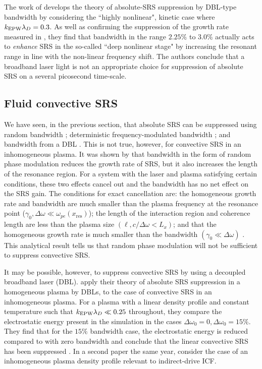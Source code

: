 The work of \citet{Zhou2018} develops the theory of absolute-SRS suppression by \acrshort{DBL}-type bandwidth by considering the ``highly nonlinear", kinetic case where $k_\mathrm{EPW}\lambda_D=0.3$. As well as confirming the suppression of the growth rate measured in \citep{Zhao2015,Zhao2017July}, they find that bandwidth in the range $2.25\%$ to $3.0\%$ actually acts to \emph{enhance} SRS in the so-called ``deep nonlinear stage" by increasing the resonant range in line with the non-linear frequency shift. The authors conclude that a broadband laser light is not an appropriate choice for suppression of absolute SRS on a several picosecond time-scale. 

\subsection{Fluid convective SRS}

We have seen, in the previous section, that absolute SRS can be suppressed using random bandwidth \citep{Thomson1974}; deterministic frequency-modulated bandwidth \citep{Zhao2015}; and bandwidth from a DBL \citep{Zhao2017July,Zhou2018}. This is not true, however, for convective SRS in an inhomogeneous plasma. It was shown by \citet{Guzdar1991} that bandwidth in the form of random phase modulation reduces the growth rate of SRS, but it also increases the length of the resonance region. For a system with the laser and plasma satisfying certain conditions, these two effects cancel out and the bandwidth has no net effect on the SRS gain. The conditions for exact cancellation are: the homogeneous growth rate and bandwidth are much smaller than the plasma frequency at the resonance point ($\gamma_0,\Delta\omega \ll \omega_{pe}(x_{\mathrm{res}})$); the length of the interaction region and coherence length are less than the plasma size $(\ell,c/\Delta\omega < L_x)$; and that the homogeneous growth rate is much smaller than the bandwidth $(\gamma_0 \ll \Delta\omega)$ \cite{Guzdar1991}. This analytical result tells us that random phase modulation will not be sufficient to suppress convective SRS.

It may be possible, however, to suppress convective SRS by using a decoupled broadband laser (\acrshort{DBL}). \citet{Zhao2017July} apply their theory of absolute SRS suppression in a homogeneous plasma by DBLs, to the case of convective SRS in an inhomogeneous plasma. For a plasma with a linear density profile and constant temperature such that $k_\mathrm{EPW}\lambda_D \ll 0.25$ throughout, they compare the electrostatic energy present in the simulation in the cases $\Delta\omega_0=0, \Delta\omega_0=15\%$. They find that for the $15\%$ bandwidth case, the electrostatic energy is reduced compared to with zero bandwidth and conclude that the linear convective SRS has been suppressed \citep{Zhao2017July}. In a second paper the same year, \citet{Zhao2017October} consider the case of an inhomogeneous plasma density profile relevant to indirect-drive ICF. 


